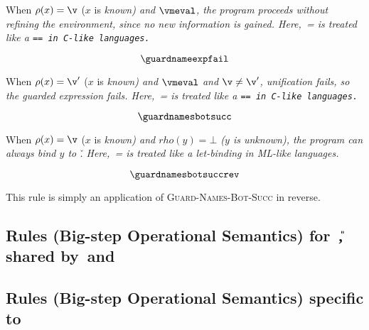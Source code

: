 \documentclass[manuscript,screen 12pt, nonacm]{acmart}
\begin{document}
When $\rho(x) = \v$ ($x$ is \it{known}) and $\vmeval$, the program proceeds
without refining the environment, since no new information is gained.
Here,~\it{=} is treated like a \tt{==} in C-like languages. 

\[
\guardnameexpfail
\]

When $\rho(x) = \v'$ ($x$ is \it{known}) and $\vmeval$ and $\v \neq \v'$,
unification fails, so the guarded expression fails. Here,~\it{=} is treated like
a \tt{==} in C-like languages. 

\[
\guardnamesbotsucc
\]

When $\rho(x) = \v$ ($x$ is \it{known}) and $rho(y) = \bot$ ($y$ is
\it{unknown}), the program can always bind $y$ to \v. Here,~\it{=} is treated
like a let-binding in ML-like languages. 

\[
\guardnamesbotsuccrev
\]

This rule is simply an application of \textsc{Guard-Names-Bot-Succ} in reverse. 
    
    \vfilbreak
    
    \subsection{Rules (Big-step Operational Semantics) for~\U, shared by~\VMinus and~\D}
    \label{usemantics1}
    \usemantics 
    \subsection{Rules (Big-step Operational Semantics) specific to~\VMinus}
    \label{vmsemantics}
    \vmsemantics
\end{document}
